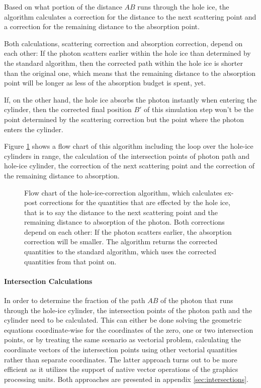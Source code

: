 Based on what portion of the distance $AB$ runs through the hole ice, the algorithm calculates a correction for the distance to the next scattering point and a correction for the remaining distance to the absorption point.

Both calculations, scattering correction and absorption correction, depend on each other: If the photon scatters earlier within the hole ice than determined by the standard algorithm, then the corrected path within the hole ice is shorter than the original one, which means that the remaining distance to the absorption point will be longer as less of the absorption budget is spent, yet.

If, on the other hand, the hole ice absorbs the photon instantly when entering the cylinder, then the corrected final position $B'$ of this simulation step won't be the point determined by the scattering correction but the point where the photon enters the cylinder.

Figure \ref{fig:bahxug7O} shows a flow chart of this algorithm including the loop over the hole-ice cylinders in range, the calculation of the intersection points of photon path and hole-ice cylinder, the correction of the next scattering point and the correction of the remaining distance to absorption.

\begin{figure}[htbp]
  \caption{Flow chart of the hole-ice-correction algorithm, which calculates ex-post corrections for the quantities that are effected by the hole ice, that is to say the distance to the next scattering point and the remaining distance to absorption of the photon. Both corrections depend on each other: If the photon scatters earlier, the absorption correction will be smaller. The algorithm returns the corrected quantities to the standard algorithm, which uses the corrected quantities from that point on.}
  \label{fig:bahxug7O}
\end{figure}

\paragraph{Intersection Calculations} In order to determine the fraction of the path $AB$ of the photon that runs through the hole-ice cylinder, the intersection points of the photon path and the cylinder need to be calculated. This can either be done solving the geometric equations coordinate-wise for the coordinates of the zero, one or two intersection points, or by treating the same scenario as vectorial problem, calculating the coordinate vectors of the intersection points using other vectorial quantities rather than separate coordinates. The latter approach turns out to be more efficient as it utilizes the support of native vector operations of the graphics processing units. Both approaches are presented in appendix \ref{sec:intersections}.

